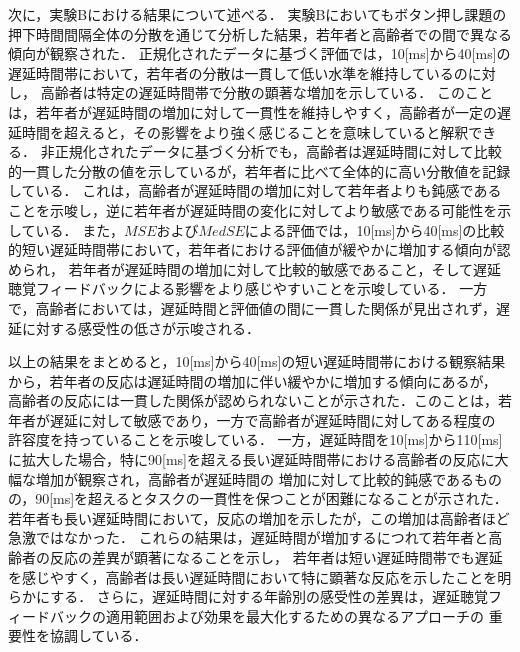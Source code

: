 次に，実験Bにおける結果について述べる．
実験Bにおいてもボタン押し課題の押下時間間隔全体の分散を通じて分析した結果，若年者と高齢者での間で異なる傾向が観察された．
正規化されたデータに基づく評価では，10[ms]から40[ms]の遅延時間帯において，若年者の分散は一貫して低い水準を維持しているのに対し，
高齢者は特定の遅延時間帯で分散の顕著な増加を示している．
このことは，若年者が遅延時間の増加に対して一貫性を維持しやすく，高齢者が一定の遅延時間を超えると，その影響をより強く感じることを意味していると解釈できる．
非正規化されたデータに基づく分析でも，高齢者は遅延時間に対して比較的一貫した分散の値を示しているが，若年者に比べて全体的に高い分散値を記録している．
これは，高齢者が遅延時間の増加に対して若年者よりも鈍感であることを示唆し，逆に若年者が遅延時間の変化に対してより敏感である可能性を示している．
また，$MSE$および$MedSE$による評価では，10[ms]から40[ms]の比較的短い遅延時間帯において，若年者における評価値が緩やかに増加する傾向が認められ，
若年者が遅延時間の増加に対して比較的敏感であること，そして遅延聴覚フィードバックによる影響をより感じやすいことを示唆している．
一方で，高齢者においては，遅延時間と評価値の間に一貫した関係が見出されず，遅延に対する感受性の低さが示唆される．

以上の結果をまとめると，10[ms]から40[ms]の短い遅延時間帯における観察結果から，若年者の反応は遅延時間の増加に伴い緩やかに増加する傾向にあるが，
高齢者の反応には一貫した関係が認められないことが示された．このことは，若年者が遅延に対して敏感であり，一方で高齢者が遅延時間に対してある程度の
許容度を持っていることを示唆している．
一方，遅延時間を10[ms]から110[ms]に拡大した場合，特に90[ms]を超える長い遅延時間帯における高齢者の反応に大幅な増加が観察され，高齢者が遅延時間の
増加に対して比較的鈍感であるものの，90[ms]を超えるとタスクの一貫性を保つことが困難になることが示された．
若年者も長い遅延時間において，反応の増加を示したが，この増加は高齢者ほど急激ではなかった．
これらの結果は，遅延時間が増加するにつれて若年者と高齢者の反応の差異が顕著になることを示し，
若年者は短い遅延時間帯でも遅延を感じやすく，高齢者は長い遅延時間において特に顕著な反応を示したことを明らかにする．
さらに，遅延時間に対する年齢別の感受性の差異は，遅延聴覚フィードバックの適用範囲および効果を最大化するための異なるアプローチの
重要性を協調している．



